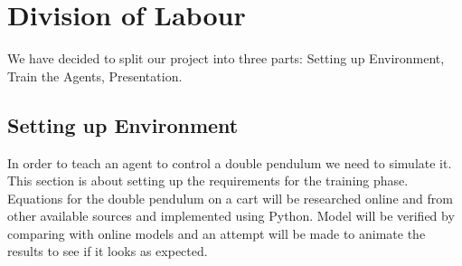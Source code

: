 \documentclass{article}
\begin{document}
%
%


\section{Division of Labour} \label{sec:division}
We have decided to split our project into three parts: Setting up Environment, Train the Agents, Presentation. 

\subsection{Setting up Environment}
In order to teach an agent to control a double pendulum we need to simulate it.
This section is about setting up the requirements for the training phase.
Equations for the double pendulum on a cart will be researched online and from other available sources and implemented using Python.
Model will be verified by comparing with online models and an attempt will be made to animate the results to see if it looks as expected.
\end{document}
